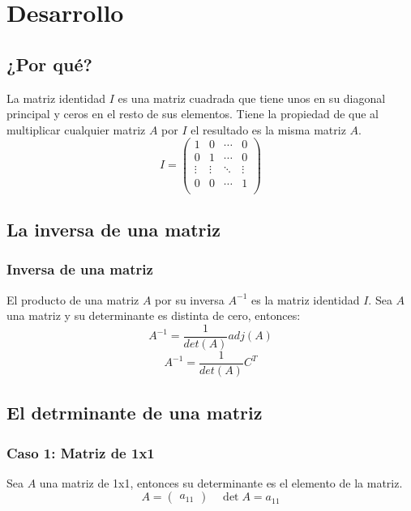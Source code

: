 \documentclass{beamer}
\begin{document}
    \section{Desarrollo}
    \subsection{¿Por qué?}

    \begin{frame}
        La matriz identidad $I$ es una matriz cuadrada que tiene unos en su diagonal principal y ceros en el resto de sus elementos.
        Tiene la propiedad de que al multiplicar cualquier matriz $A$ por $I$ el resultado es la misma matriz $A$.
        $$
        I =
        \begin{pmatrix}
            1 & 0 & \cdots & 0 \\
            0 & 1 & \cdots & 0 \\
            \vdots & \vdots & \ddots & \vdots \\
            0 & 0 & \cdots & 1 \\
        \end{pmatrix}
        $$

    \end{frame}


    \subsection{La inversa de una matriz}

    \begin{frame}
        \frametitle{Inversa de una matriz}
        El producto de una matriz $A$ por su inversa $A^{-1}$ es la matriz identidad $I$.
        Sea $A$ una matriz y su determinante es distinta de cero, entonces:
        $$
        A^{-1} = \frac{1}{det(A)}adj(A)
        $$
        $$
        A^{-1} = \frac{1}{det(A)}C^{T}
        $$
    \end{frame}

    \subsection{El detrminante de una matriz}

    \begin{frame}
        \frametitle{Caso 1: Matriz de 1x1}
        Sea $A$ una matriz de 1x1, entonces su determinante es el elemento de la matriz.
        $$
        A =
        \begin{pmatrix}
            a_{11}
        \end{pmatrix}
        \quad \det{A} = a_{11}
        $$
    \end{frame}
\end{document}
